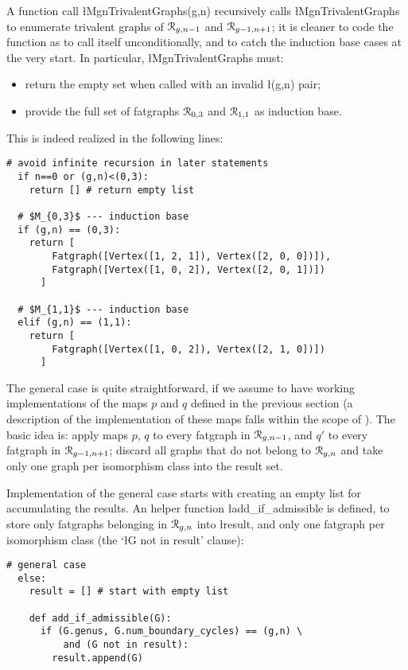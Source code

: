A function call \l{MgnTrivalentGraphs(g,n)} recursively calls
\l{MgnTrivalentGraphs} to enumerate trivalent graphs of $\mathcal{R}_{g,n-1}$
and $\mathcal{R}_{g-1,n+1}$; it is cleaner to code the function as to call itself
unconditionally, and to catch the induction base cases at the very
start.  In particular, \l{MgnTrivalentGraphs} must:
\begin{itemize}
\item return the empty set when called with an invalid \l{(g,n)} pair;
\item provide the full set of fatgraphs $\mathcal{R}_{0,3}$ and $\mathcal{R}_{1,1}$ as
  induction base.
\end{itemize}
This is indeed realized in the following lines:
\begin{lstlisting}[name=MgnTrivalentGraphs,firstnumber=6]
  # avoid infinite recursion in later statements
  if n==0 or (g,n)<(0,3):
    return [] # return empty list

  # $M_{0,3}$ --- induction base
  if (g,n) == (0,3):
    return [ 
        Fatgraph([Vertex([1, 2, 1]), Vertex([2, 0, 0])]),
        Fatgraph([Vertex([1, 0, 2]), Vertex([2, 0, 1])]) 
      ]

  # $M_{1,1}$ --- induction base
  elif (g,n) == (1,1):
    return [ 
        Fatgraph([Vertex([1, 0, 2]), Vertex([2, 1, 0])]) 
      ]
\end{lstlisting}

The general case is quite straightforward, if we assume to have
working implementations of the maps $p$ and $q$ defined in the
previous section (a description of the implementation of these maps
falls within the scope of ).  The basic
idea is: apply maps $p$, $q$ to every fatgraph in $\mathcal{R}_{g,n-1}$, and
$q'$ to every fatgraph in $\mathcal{R}_{g-1,n+1}$; discard all graphs that do
not belong to $\mathcal{R}_{g,n}$ and take only one graph per isomorphism class
into the result set.

Implementation of the general case starts with creating an empty list
for accumulating the results.  An helper function
\l{add_if_admissible} is defined, to store only fatgraphs belonging in
$\mathcal{R}_{g,n}$ into \l{result}, and only one fatgraph per isomorphism
class (the `\l{G not in result}' clause):
\begin{lstlisting}[name=MgnTrivalentGraphs,firstnumber=22]
  # general case
  else:
    result = [] # start with empty list

    def add_if_admissible(G):
      if (G.genus, G.num_boundary_cycles) == (g,n) \
          and (G not in result):
        result.append(G)
      
\end{lstlisting}

